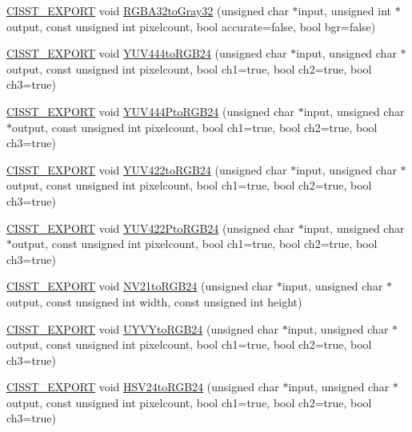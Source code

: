 \begin{DoxyCompactItemize}
\item 
\hyperlink{cmn_export_macros_8h_a99393e0c3ac434b2605235bbe20684f8}{C\-I\-S\-S\-T\-\_\-\-E\-X\-P\-O\-R\-T} void \hyperlink{namespacesvl_converter_af5b67f08a4b804d5204d98bb0ee5557f}{R\-G\-B\-A32to\-Gray32} (unsigned char $\ast$input, unsigned int $\ast$output, const unsigned int pixelcount, bool accurate=false, bool bgr=false)
\item 
\hyperlink{cmn_export_macros_8h_a99393e0c3ac434b2605235bbe20684f8}{C\-I\-S\-S\-T\-\_\-\-E\-X\-P\-O\-R\-T} void \hyperlink{namespacesvl_converter_ad344ee1b5377e0ef400da695584ebd53}{Y\-U\-V444to\-R\-G\-B24} (unsigned char $\ast$input, unsigned char $\ast$output, const unsigned int pixelcount, bool ch1=true, bool ch2=true, bool ch3=true)
\item 
\hyperlink{cmn_export_macros_8h_a99393e0c3ac434b2605235bbe20684f8}{C\-I\-S\-S\-T\-\_\-\-E\-X\-P\-O\-R\-T} void \hyperlink{namespacesvl_converter_adaf832870c71537af4542ae677d7c1ad}{Y\-U\-V444\-Pto\-R\-G\-B24} (unsigned char $\ast$input, unsigned char $\ast$output, const unsigned int pixelcount, bool ch1=true, bool ch2=true, bool ch3=true)
\item 
\hyperlink{cmn_export_macros_8h_a99393e0c3ac434b2605235bbe20684f8}{C\-I\-S\-S\-T\-\_\-\-E\-X\-P\-O\-R\-T} void \hyperlink{namespacesvl_converter_aa50bea9710e0c790d0966fad98376319}{Y\-U\-V422to\-R\-G\-B24} (unsigned char $\ast$input, unsigned char $\ast$output, const unsigned int pixelcount, bool ch1=true, bool ch2=true, bool ch3=true)
\item 
\hyperlink{cmn_export_macros_8h_a99393e0c3ac434b2605235bbe20684f8}{C\-I\-S\-S\-T\-\_\-\-E\-X\-P\-O\-R\-T} void \hyperlink{namespacesvl_converter_a223a6406dbb0d166db1daacd95d64dea}{Y\-U\-V422\-Pto\-R\-G\-B24} (unsigned char $\ast$input, unsigned char $\ast$output, const unsigned int pixelcount, bool ch1=true, bool ch2=true, bool ch3=true)
\item 
\hyperlink{cmn_export_macros_8h_a99393e0c3ac434b2605235bbe20684f8}{C\-I\-S\-S\-T\-\_\-\-E\-X\-P\-O\-R\-T} void \hyperlink{namespacesvl_converter_a29fb7339f7fa53fae9745d2575a724ba}{N\-V21to\-R\-G\-B24} (unsigned char $\ast$input, unsigned char $\ast$output, const unsigned int width, const unsigned int height)
\item 
\hyperlink{cmn_export_macros_8h_a99393e0c3ac434b2605235bbe20684f8}{C\-I\-S\-S\-T\-\_\-\-E\-X\-P\-O\-R\-T} void \hyperlink{namespacesvl_converter_acc95903b2333fce1161aac393bee5288}{U\-Y\-V\-Yto\-R\-G\-B24} (unsigned char $\ast$input, unsigned char $\ast$output, const unsigned int pixelcount, bool ch1=true, bool ch2=true, bool ch3=true)
\item 
\hyperlink{cmn_export_macros_8h_a99393e0c3ac434b2605235bbe20684f8}{C\-I\-S\-S\-T\-\_\-\-E\-X\-P\-O\-R\-T} void \hyperlink{namespacesvl_converter_aefe398f1f6c73774eaf685b9c2fe3aeb}{H\-S\-V24to\-R\-G\-B24} (unsigned char $\ast$input, unsigned char $\ast$output, const unsigned int pixelcount, bool ch1=true, bool ch2=true, bool ch3=true)
\end{DoxyCompactItemize}


